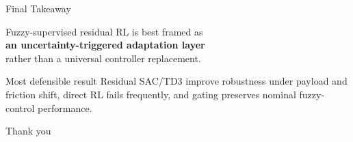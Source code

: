 \documentclass[aspectratio=169,10pt]{beamer}
\begin{document}
\begin{frame}{Final Takeaway}
  \begin{center}
    \Large Fuzzy-supervised residual RL is best framed as\\[0.25em]
    \textbf{an uncertainty-triggered adaptation layer}\\[0.25em]
    rather than a universal controller replacement.
  \end{center}
  \vfill
  \begin{block}{Most defensible result}
    Residual SAC/TD3 improve robustness under payload and friction shift, direct RL fails frequently, and gating preserves nominal fuzzy-control performance.
  \end{block}
  \vfill
  \begin{center}
    \large Thank you
  \end{center}
\end{frame}
\end{document}
